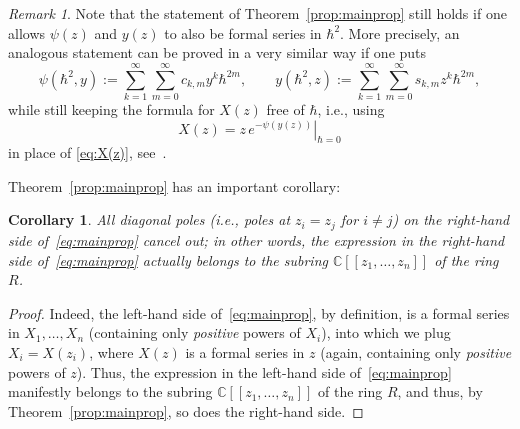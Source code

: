 \documentclass[11pt]{article}
\newcommand{\ie}{i.e.,\xspace}
\newcommand{\llbracket}{[\![}
\newcommand{\rrbracket}{]\!]}
\theoremstyle{plain}
\newtheorem{corollary}[theorem]{Corollary}
\theoremstyle{definition}
\theoremstyle{remark}
\newtheorem{remark}[theorem]{Remark}
\begin{document}
\begin{remark} \label{rem:DHdeformed}
Note that the statement of Theorem~\ref{prop:mainprop} still holds if one allows $\psi(z)$ and $y(z)$ to also be formal series in $\hbar^2$. More precisely, an analogous statement can be proved in a very similar way if one puts
\[
\psi(\hbar^2,y):=\sum_{k=1}^\infty\sum_{m=0}^\infty c_{k,m} y^k\hbar^{2m},\qquad
y(\hbar^2,z):=\sum_{k=1}^\infty\sum_{m=0}^\infty s_{k,m} z^k\hbar^{2m},
\]
while still keeping the formula for $X(z)$ free of $\hbar$, \ie using
\begin{equation*}
X(z)=\left.z\,e^{-\psi(y(z))}\right|_{\hbar=0}
\end{equation*}
in place of \eqref{eq:X(z)}, see~\cite[\S 2]{BDKS21toprec}.
\end{remark}

Theorem~\ref{prop:mainprop} has an important corollary:

\begin{corollary}\label{cor:diagonal}
All diagonal poles (\ie poles at $z_i=z_j$ for $i\neq j$) on the right-hand side of~\eqref{eq:mainprop} cancel out; in other words, the expression in the right-hand side of~\eqref{eq:mainprop} actually belongs to the subring $\mathbb{C}\llbracket z_1,\dots,z_n\rrbracket $ of the ring $R$.
\end{corollary}
\begin{proof}
Indeed, the left-hand side of~\eqref{eq:mainprop}, by definition, is a formal series in $X_1,\dots,X_n$ (containing only \emph{positive} powers of $X_i$), into which we plug $X_i=X(z_i)$, where $X(z)$ is a formal series in $z$ (again, containing only \emph{positive} powers of $z$). Thus, the expression in the left-hand side of~\eqref{eq:mainprop} manifestly belongs to the subring $\mathbb{C}\llbracket z_1,\dots,z_n\rrbracket $ of the ring $R$, and thus, by Theorem~\ref{prop:mainprop}, so does the right-hand side.
\end{proof}
\end{document}
